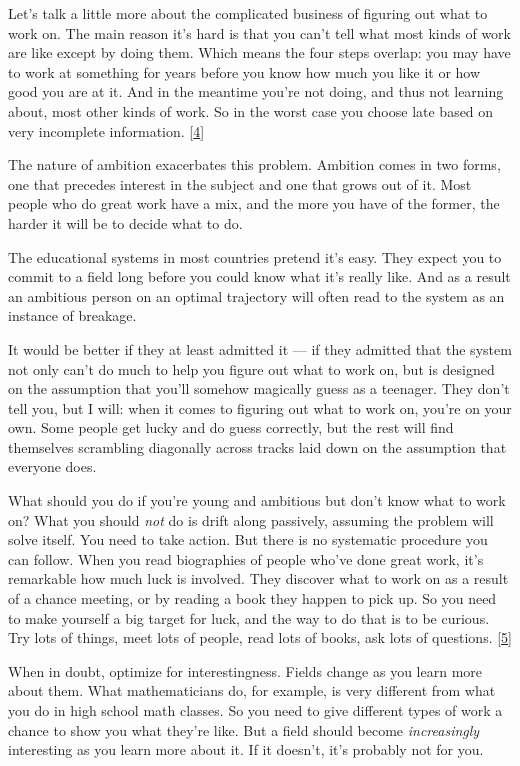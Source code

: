 Let's talk a little more about the complicated business of figuring out
what to work on. The main reason it's hard is that you can't tell what
most kinds of work are like except by doing them. Which means the four
steps overlap: you may have to work at something for years before you
know how much you like it or how good you are at it. And in the meantime
you're not doing, and thus not learning about, most other kinds of work.
So in the worst case you choose late based on very incomplete
information. {[}\hyperref[f4n]{4}{]}

The nature of ambition exacerbates this problem. Ambition comes in two
forms, one that precedes interest in the subject and one that grows out
of it. Most people who do great work have a mix, and the more you have
of the former, the harder it will be to decide what to do.

The educational systems in most countries pretend it's easy. They expect
you to commit to a field long before you could know what it's really
like. And as a result an ambitious person on an optimal trajectory will
often read to the system as an instance of breakage.

It would be better if they at least admitted it --- if they admitted
that the system not only can't do much to help you figure out what to
work on, but is designed on the assumption that you'll somehow magically
guess as a teenager. They don't tell you, but I will: when it comes to
figuring out what to work on, you're on your own. Some people get lucky
and do guess correctly, but the rest will find themselves scrambling
diagonally across tracks laid down on the assumption that everyone does.

What should you do if you're young and ambitious but don't know what to
work on? What you should \emph{not} do is drift along passively,
assuming the problem will solve itself. You need to take action. But
there is no systematic procedure you can follow. When you read
biographies of people who've done great work, it's remarkable how much
luck is involved. They discover what to work on as a result of a chance
meeting, or by reading a book they happen to pick up. So you need to
make yourself a big target for luck, and the way to do that is to be
curious. Try lots of things, meet lots of people, read lots of books,
ask lots of questions. {[}\hyperref[f5n]{5}{]}

When in doubt, optimize for interestingness. Fields change as you learn
more about them. What mathematicians do, for example, is very different
from what you do in high school math classes. So you need to give
different types of work a chance to show you what they're like. But a
field should become \emph{increasingly} interesting as you learn more
about it. If it doesn't, it's probably not for you.

